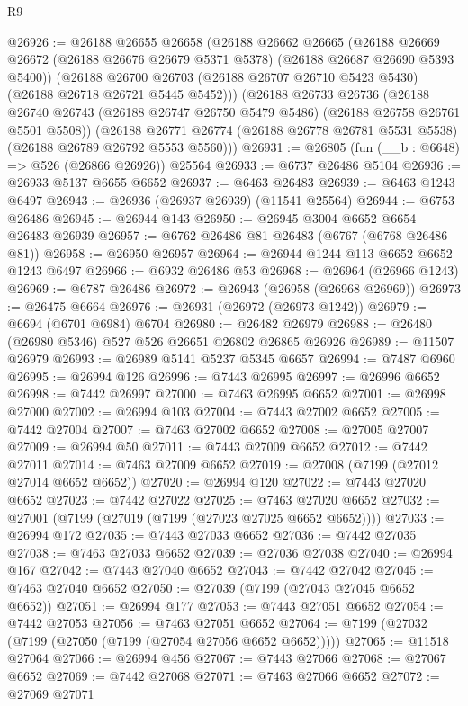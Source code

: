 \begin{lexlean}{R9}
\begin{coremodule}
@26926 := @26188
    @26655
    @26658
    (@26188
      @26662
      @26665
      (@26188 @26669 @26672 (@26188 @26676 @26679 @5371 @5378) (@26188 @26687 @26690 @5393 @5400))
      (@26188 @26700 @26703 (@26188 @26707 @26710 @5423 @5430) (@26188 @26718 @26721 @5445 @5452)))
    (@26188
      @26733
      @26736
      (@26188 @26740 @26743 (@26188 @26747 @26750 @5479 @5486) (@26188 @26758 @26761 @5501 @5508))
      (@26188 @26771 @26774 (@26188 @26778 @26781 @5531 @5538) (@26188 @26789 @26792 @5553 @5560)))
@26931 := @26805 (fun (__b : @6648) => @526 (@26866 @26926)) @25564
@26933 := @6737 @26486 @5104
@26936 := @26933 @5137 @6655 @6652
@26937 := @6463 @26483
@26939 := @6463 @1243 @6497
@26943 := @26936 (@26937 @26939) (@11541 @25564)
@26944 := @6753 @26486
@26945 := @26944 @143
@26950 := @26945 @3004 @6652 @6654 @26483 @26939
@26957 := @6762 @26486 @81 @26483 (@6767 (@6768 @26486 @81))
@26958 := @26950 @26957
@26964 := @26944 @1244 @113 @6652 @6652 @1243 @6497
@26966 := @6932 @26486 @53
@26968 := @26964 (@26966 @1243)
@26969 := @6787 @26486
@26972 := @26943 (@26958 (@26968 @26969))
@26973 := @26475 @6664
@26976 := @26931 (@26972 (@26973 @1242))
@26979 := @6694 (@6701 @6984) @6704
@26980 := @26482 @26979
@26988 := @26480 (@26980 @5346) @527 @526 @26651 @26802 @26865 @26926
@26989 := @11507 @26979
@26993 := @26989 @5141 @5237 @5345 @6657
@26994 := @7487 @6960
@26995 := @26994 @126
@26996 := @7443 @26995
@26997 := @26996 @6652
@26998 := @7442 @26997
@27000 := @7463 @26995 @6652
@27001 := @26998 @27000
@27002 := @26994 @103
@27004 := @7443 @27002 @6652
@27005 := @7442 @27004
@27007 := @7463 @27002 @6652
@27008 := @27005 @27007
@27009 := @26994 @50
@27011 := @7443 @27009 @6652
@27012 := @7442 @27011
@27014 := @7463 @27009 @6652
@27019 := @27008 (@7199 (@27012 @27014 @6652 @6652))
@27020 := @26994 @120
@27022 := @7443 @27020 @6652
@27023 := @7442 @27022
@27025 := @7463 @27020 @6652
@27032 := @27001 (@7199 (@27019 (@7199 (@27023 @27025 @6652 @6652))))
@27033 := @26994 @172
@27035 := @7443 @27033 @6652
@27036 := @7442 @27035
@27038 := @7463 @27033 @6652
@27039 := @27036 @27038
@27040 := @26994 @167
@27042 := @7443 @27040 @6652
@27043 := @7442 @27042
@27045 := @7463 @27040 @6652
@27050 := @27039 (@7199 (@27043 @27045 @6652 @6652))
@27051 := @26994 @177
@27053 := @7443 @27051 @6652
@27054 := @7442 @27053
@27056 := @7463 @27051 @6652
@27064 := @7199 (@27032 (@7199 (@27050 (@7199 (@27054 @27056 @6652 @6652)))))
@27065 := @11518 @27064
@27066 := @26994 @456
@27067 := @7443 @27066
@27068 := @27067 @6652
@27069 := @7442 @27068
@27071 := @7463 @27066 @6652
@27072 := @27069 @27071

\end{coremodule}
\end{lexlean}
